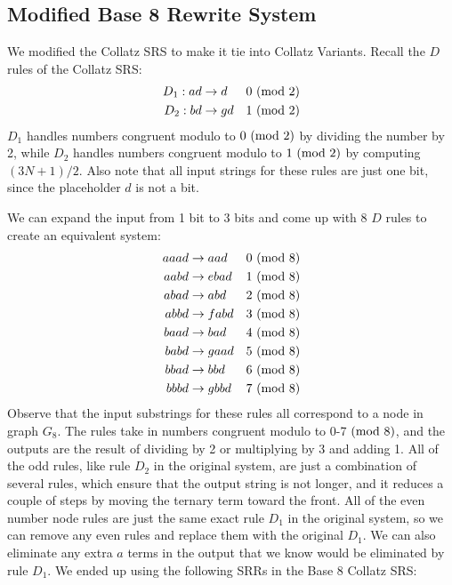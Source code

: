 \subsection{Modified Base 8 Rewrite System} \label{subsec:base8rewrite}
We modified the Collatz SRS to make it tie into Collatz Variants. Recall the $D$ rules of the Collatz SRS:
\begin{align*}
    D_1: ad &\rightarrow d &\text{$0\ (\mathrm{mod}\ 2)$}\\
    D_2: bd &\rightarrow gd &\text{$1\ (\mathrm{mod}\ 2)$}\\
\end{align*}
$D_1$ handles numbers congruent modulo to $0 \ (\mathrm{mod}\ 2)$ by dividing the number by 2, while $D_2$ handles numbers congruent modulo to $1 \ (\mathrm{mod}\ 2)$  by computing $(3N+1)/2$. Also note that all input strings for these rules are just one bit, since the placeholder $d$ is not a bit.\par
We can expand the input from 1 bit to 3 bits and come up with 8 $D$ rules to create an equivalent system:
\begin{align*}
    aaad &\rightarrow aad &\text{$0\ (\mathrm{mod}\ 8)$}\\
    aabd &\rightarrow ebad &\text{$1\ (\mathrm{mod}\ 8)$}\\
    abad &\rightarrow abd &\text{$2\ (\mathrm{mod}\ 8)$}\\
    abbd &\rightarrow fabd &\text{$3\ (\mathrm{mod}\ 8)$}\\
    baad &\rightarrow bad &\text{$4\ (\mathrm{mod}\ 8)$}\\
    babd &\rightarrow gaad &\text{$5\ (\mathrm{mod}\ 8)$}\\
    bbad &\rightarrow bbd &\text{$6\ (\mathrm{mod}\ 8)$}\\
    bbbd &\rightarrow gbbd &\text{$7\ (\mathrm{mod}\ 8)$}
\end{align*}
Observe that the input substrings for these rules all correspond to a node in graph $G_8$. The rules take in numbers congruent modulo to 0-7$\ (\mathrm{mod}\ 8)$, and the outputs are the result of dividing by 2 or multiplying by 3 and adding 1. All of the odd rules, like rule $D_2$ in the original system, are just a combination of several rules, which ensure that the output string is not longer, and it reduces a couple of steps by moving the ternary term toward the front. All of the even number node rules are just the same exact rule $D_1$ in the original system, so we can remove any even rules and replace them with the original $D_1$. We can also eliminate any extra $a$ terms in the output that we know would be eliminated by rule $D_1$. We ended up using the following SRRs in the Base 8 Collatz SRS:
